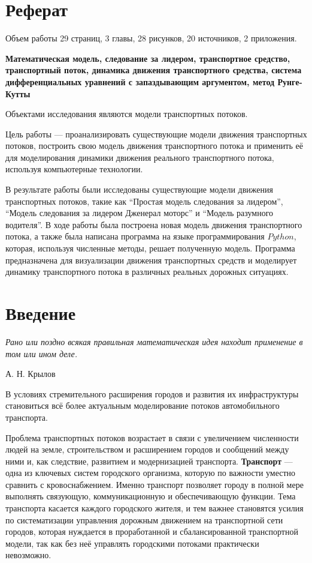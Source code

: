 \documentclass[12pt, a4paper]{extarticle}
\numberwithin{equation}{section}
\numberwithin{figure}{section}
\begin{document}
\justify 
\setlength{\parindent}{1.25cm} 
\newpage 
\thispagestyle{empty} 

\section*{Реферат}
\vspace{\baselineskip}	
Объем работы 29 страниц, 3 главы, 28 рисунков, 20 источников, 2 приложения.

\textbf{Математическая модель, следование за лидером, транспортное средство, транспортный поток, динамика движения транспортного средства, система дифференциальных уравнений с запаздывающим аргументом, метод Рунге-Кутты}

Объектами исследования являются модели транспортных потоков.

Цель работы --- проанализировать существующие модели движения транспортных потоков, построить свою модель движения транспортного потока и применить её для моделирования динамики движения реального транспортного потока, используя компьютерные технологии.                                          

В результате работы были исследованы существующие модели движения транспортных потоков, такие как ``Простая модель следования за лидером'', ``Модель следования за лидером Дженерал моторс'' и ``Модель разумного водителя''. В ходе работы была построена новая модель движения транспортного потока, а также была написана программа на языке программирования $Python$, которая, используя численные методы, решает полученную модель. Программа предназначена для визуализации движения транспортных средств и моделирует динамику транспортного потока в различных реальных дорожных ситуациях.

\newpage

\setcounter{page}{2}

\tableofcontents 
\newpage 

\section*{Введение}
\epigraph{\textit{Рано или поздно всякая правильная математическая идея находит применение в том или ином деле.}}
{А. Н. Крылов}
В условиях стремительного расширения городов и развития их инфраструктуры становиться всё более актуальным моделирование потоков автомобильного транспорта. 

Проблема транспортных потоков возрастает в связи с увеличением численности людей на земле, строительством и расширением городов и сообщений между ними и, как следствие, развитием и модернизацией транспорта.  \textbf{Транспорт} --- одна из ключевых систем городского организма, которую по важности уместно сравнить с кровоснабжением. Именно транспорт позволяет городу в полной мере выполнять связующую, коммуникационную и обеспечивающую функции. Тема транспорта касается каждого городского жителя, и тем важнее становятся усилия по систематизации управления дорожным движением на транспортной сети городов, которая нуждается в проработанной и сбалансированной транспортной модели, так как без неё управлять городскими потоками практически невозможно. 
\end{document}
